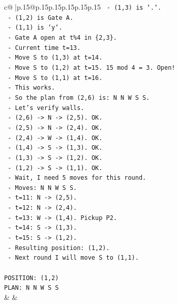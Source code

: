 \documentclass{article}
\begin{document}
{\begin{supertabular}{c@{$\;$}|p{.15\linewidth}@{}p{.15\linewidth}p{.15\linewidth}p{.15\linewidth}p{.15\linewidth}p{.15\linewidth}}
{{{\texttt{  {-} (1,3) is `.`.} \\
\texttt{  {-} (1,2) is Gate A.} \\
\texttt{  {-} (1,1) is `y`.} \\
\texttt{  {-} Gate A open at t\%4 in \{2,3\}.} \\
\texttt{  {-} Current time t=13.} \\
\texttt{  {-} Move S to (1,3) at t=14.} \\
\texttt{  {-} Move S to (1,2) at t=15. 15 mod 4 = 3. Open!} \\
\texttt{  {-} Move S to (1,1) at t=16.} \\
\texttt{  {-} This works.} \\
\texttt{  {-} So the plan from (2,6) is: N N W S S.} \\
\texttt{  {-} Let's verify walls.} \\
\texttt{  {-} (2,6) {-}> N {-}> (2,5). OK.} \\
\texttt{  {-} (2,5) {-}> N {-}> (2,4). OK.} \\
\texttt{  {-} (2,4) {-}> W {-}> (1,4). OK.} \\
\texttt{  {-} (1,4) {-}> S {-}> (1,3). OK.} \\
\texttt{  {-} (1,3) {-}> S {-}> (1,2). OK.} \\
\texttt{  {-} (1,2) {-}> S {-}> (1,1). OK.} \\
\texttt{  {-} Wait, I need 5 moves for this round.} \\
\texttt{  {-} Moves: N N W S S.} \\
\texttt{  {-} t=11: N {-}> (2,5).} \\
\texttt{  {-} t=12: N {-}> (2,4).} \\
\texttt{  {-} t=13: W {-}> (1,4). Pickup P2.} \\
\texttt{  {-} t=14: S {-}> (1,3).} \\
\texttt{  {-} t=15: S {-}> (1,2).} \\
\texttt{  {-} Resulting position: (1,2).} \\
\texttt{  {-} Next round I will move S to (1,1).} \\
\\ 
\texttt{POSITION: (1,2)} \\
\texttt{PLAN: N N W S S} \\
            }
        }
    }
    & & \\ \\


\end{supertabular}}
\end{document}
